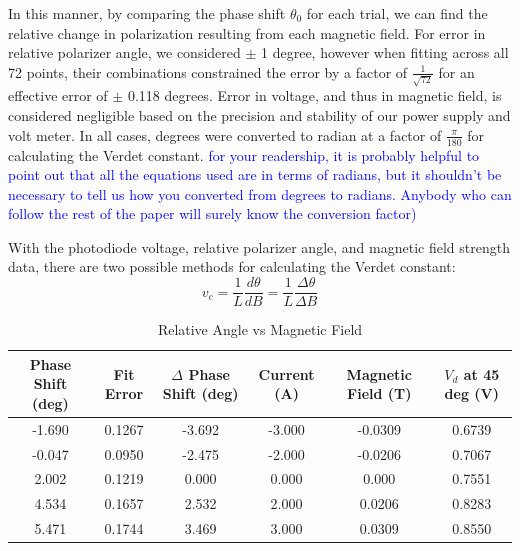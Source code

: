 \documentclass[prb,preprint]{revtex4-1}
\begin{document}
In this manner, by comparing the phase shift $\theta_0$ for each trial, we can find the relative change in polarization resulting from each magnetic field. For error in relative polarizer angle, we considered $\pm$ 1 degree, however when fitting across all 72 points, their combinations constrained the error by a factor of $\frac{1}{\sqrt{72}}$ for an effective error of $\pm$ 0.118 degrees. Error in voltage, and thus in magnetic field, is considered negligible based on the precision and stability of our power supply and volt meter. In all cases, degrees were converted to radian at a factor of $\frac{\pi}{180}$ for calculating the Verdet constant.
\textcolor{blue}{for your readership, it is probably helpful to point out that all the equations used are in terms of radians, but it shouldn't be necessary to tell us how you converted from degrees to radians. Anybody who can follow the rest of the paper will surely know the conversion factor)} 

With the photodiode voltage, relative polarizer angle, and magnetic field strength data, there are two possible methods for calculating the Verdet constant:
\begin{equation}
\label{verdet eqn}
v_c=\frac{1}{L}\frac{d\theta }{dB}=\frac{1}{L}\frac{\Delta \theta }{\Delta B}
\end{equation}

\begin{table}[H]
\centering
\caption{Relative Angle vs Magnetic Field}


\renewcommand{\arraystretch}{1.8}
\begin{ruledtabular}
\begin{tabular}{c c c c c c}
Phase Shift (deg) & Fit Error & $\Delta$ Phase Shift (deg) & Current (A) & Magnetic Field (T) & $V_d$ at 45 deg (V)\\
\hline
-1.690 & 0.1267 & -3.692 & -3.000 & -0.0309 & 0.6739 \\
-0.047 & 0.0950 & -2.475 & -2.000 & -0.0206 & 0.7067 \\
2.002  & 0.1219 & 0.000  & 0.000 & 0.000   & 0.7551 \\
4.534  & 0.1657 & 2.532  & 2.000 & 0.0206  & 0.8283 \\
5.471  & 0.1744 & 3.469  & 3.000 & 0.0309  & 0.8550 \\
\end{tabular}
\end{ruledtabular}
\label{AnglevsB}
\end{table}
\end{document}
